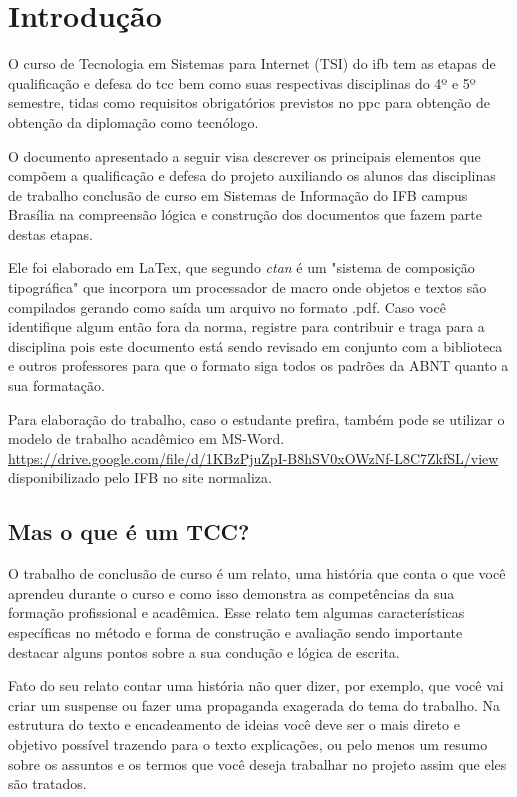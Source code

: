 \chapter{Introdução}
\label{chp:introduction}

O curso de Tecnologia em Sistemas para Internet (TSI) do \ac{ifb} tem as etapas de qualificação e defesa do \ac{tcc} bem como suas respectivas disciplinas do 4º e 5º semestre, tidas como requisitos obrigatórios previstos no \ac{ppc} para obtenção de obtenção da diplomação como tecnólogo.

O documento apresentado a seguir visa descrever os principais elementos que compõem a qualificação e defesa do projeto auxiliando os alunos das disciplinas de trabalho conclusão de curso em Sistemas de Informação do IFB campus Brasília na compreensão lógica e construção dos documentos que fazem parte destas etapas.

Ele foi elaborado em LaTex, que segundo \textit{\ac{ctan}} é um "sistema de composição tipográfica"  \citep{ctan} que incorpora um processador de macro onde objetos e textos são compilados gerando como saída um arquivo no formato .pdf. Caso você identifique algum então fora da norma, registre para contribuir e traga para a disciplina pois este documento está sendo revisado em conjunto com a biblioteca e outros professores para que o formato siga todos os padrões da ABNT quanto a sua formatação. 

Para elaboração do trabalho, caso o estudante prefira, também pode se utilizar o modelo de trabalho acadêmico em MS-Word.
\url{https://drive.google.com/file/d/1KBzPjuZpI-B8hSV0xOWzNf-L8C7ZkfSL/view} disponibilizado pelo IFB no site normaliza. 


\section{Mas o que é um TCC?}

O trabalho de conclusão de curso é um relato, uma história que conta o que você aprendeu durante o curso e como isso demonstra as competências da sua formação profissional e acadêmica. Esse relato tem algumas características específicas no método e forma de construção e avaliação sendo importante destacar alguns pontos sobre a sua condução e lógica de escrita.

Fato do seu relato contar uma história não quer dizer, por exemplo, que você vai criar um suspense ou fazer uma propaganda exagerada do tema do trabalho. Na estrutura do texto e encadeamento de ideias você deve ser o mais direto e objetivo possível trazendo para o texto explicações, ou pelo menos um resumo sobre os assuntos e os termos que você deseja trabalhar no projeto assim que eles são tratados.

